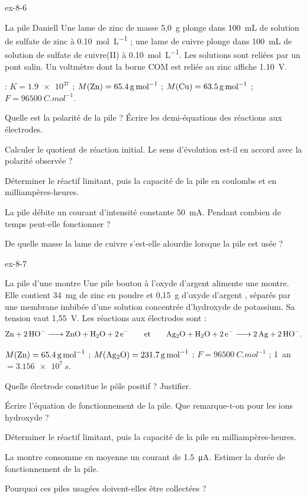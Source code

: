 \begin{blocLivre}{ex-8-6}
\begin{exercice}[2]{La pile Daniell}
Une lame de zinc de masse 5,0~g plonge dans 100~mL de solution de sulfate de zinc à \qty{0,10}{mol.L^{-1}} ; une lame de
cuivre plonge dans 100~mL de solution de sulfate de cuivre(II) à \qty{0,10}{mol.L^{-1}}. Les solutions sont reliées par un
pont salin. Un voltmètre dont la borne COM est reliée au zinc affiche \qty{1,10}{V}.
\begin{donnees}
 : $K=\num{1.9e37}$ ; $M(\ce{Zn})=\qty{65,4}{g.mol^{-1}}$ ;
$M(\ce{Cu})=\qty{63,5}{g.mol^{-1}}$ ; $F=\qty{96500}{C.mol^{-1}}$.
\end{donnees}
\begin{questions}
\item Quelle est la polarité de la pile ? Écrire les demi-équations des réactions aux électrodes.
\item Calculer le quotient de réaction initial. Le sens d'évolution est-il en accord avec la polarité observée ?
\item Déterminer le réactif limitant, puis la capacité de la pile en coulombs et en milliampères-heures.
\item La pile débite un courant d'intensité constante \qty{50}{mA}. Pendant combien de temps peut-elle fonctionner ?
\item De quelle masse la lame de cuivre s'est-elle alourdie lorsque la pile est usée ?
\end{questions}
\end{exercice}
\end{blocLivre}
\begin{blocLivre}{ex-8-7}
\begin{exercice}[2]{La pile d'une montre}
Une pile bouton à l'oxyde d'argent alimente une montre. Elle contient 34~mg de zinc en poudre et 0,15~g d'oxyde
d'argent , séparés par une membrane imbibée d'une solution concentrée d'hydroxyde de potassium. Sa tension vaut
1,55~V. Les réactions aux électrodes sont :
\[\ce{Zn + 2 HO- -> ZnO + H2O + 2 e-}\qquad\text{et}\qquad\ce{Ag2O + H2O + 2 e- -> 2 Ag + 2 HO-}.\]
\begin{donnees}
$M(\ce{Zn})=\qty{65,4}{g.mol^{-1}}$ ; $M(\ce{Ag2O})=\qty{231,7}{g.mol^{-1}}$ ; $F=\qty{96500}{C.mol^{-1}}$ ;
\mbox{1 an $=\qty{3,156e7}{s}$}.
\end{donnees}
\begin{questions}
\item Quelle électrode constitue le pôle positif ? Justifier.
\item Écrire l'équation de fonctionnement de la pile. Que remarque-t-on pour les ions hydroxyde ?
\item Déterminer le réactif limitant, puis la capacité de la pile en milliampères-heures.
\item La montre consomme en moyenne un courant de \qty{1,5}{\micro A}. Estimer la durée de fonctionnement de la pile.
\item Pourquoi ces piles usagées doivent-elles être collectées ?
\end{questions}
\end{exercice}
\end{blocLivre}
